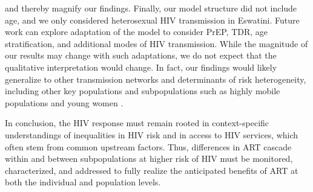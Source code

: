 and thereby magnify our findings.
Finally, our model structure did not include age,
and we only considered heterosexual HIV transmission in Eswatini.
Future work can explore adaptation of the model to consider
PrEP, TDR, age stratification, and additional modes of HIV transmission.
While the magnitude of our results may change with such adaptations,
we do not expect that the qualitative interpretation would change.
In fact, our findings would likely generalize
to other transmission networks and determinants of risk heterogeneity,
including other key populations and subpopulations such as
highly mobile populations and young women \cite{Camlin2019,Cheuk2020}.
\par
In conclusion, the HIV response must remain rooted in
context-specific understandings of inequalities in HIV risk and in access to HIV services,
which often stem from common upstream factors.
Thus, differences in ART cascade within and between subpopulations at higher risk of HIV
must be monitored, characterized, and addressed
to fully realize the anticipated benefits of ART
at both the individual and population levels.
